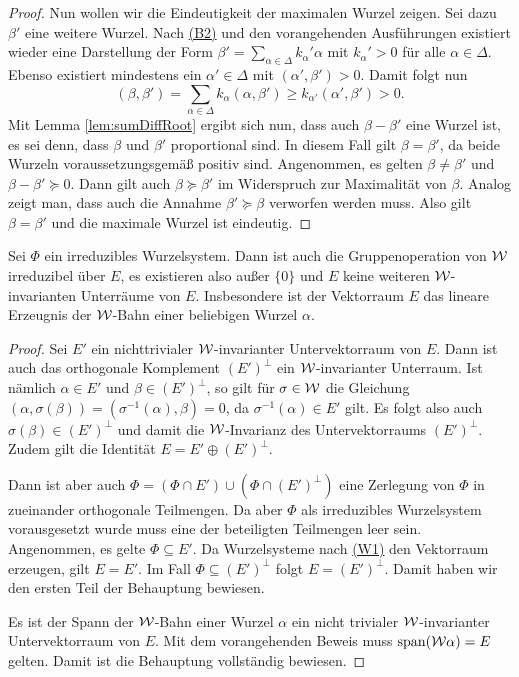 \begin{proof}
  Nun wollen wir die Eindeutigkeit der maximalen Wurzel zeigen.
  Sei dazu $\beta'$ eine weitere Wurzel.
  Nach \hyperref[it:B2]{(B2)} und den vorangehenden Ausführungen existiert wieder eine Darstellung der Form $\beta' = \sum_{\alpha \in \Delta} k_\alpha' \alpha$ mit $k_\alpha' > 0$ für alle $\alpha \in \Delta$.
  Ebenso existiert mindestens ein $\alpha' \in \Delta$ mit $(\alpha', \beta') > 0$.
  Damit folgt nun
  \begin{displaymath}
    (\beta, \beta') = \sum_{\alpha \in \Delta} k_\alpha (\alpha, \beta') \geq k_{\alpha'} (\alpha', \beta') > 0.
  \end{displaymath}
  Mit Lemma \ref{lem:sumDiffRoot} ergibt sich nun, dass auch $\beta - \beta'$ eine Wurzel ist, es sei denn, dass $\beta$ und $\beta'$ proportional sind. 
  In diesem Fall gilt $\beta = \beta'$, da beide Wurzeln voraussetzungsgemäß positiv sind.
  Angenommen, es gelten $\beta \neq \beta'$ und $\beta - \beta' \succeq 0$.
  Dann gilt auch $\beta \succeq \beta'$ im Widerspruch zur Maximalität von $\beta$.
  Analog zeigt man, dass auch die Annahme $\beta' \succeq \beta$ verworfen werden muss.
  Also gilt $\beta = \beta'$ und die maximale Wurzel ist eindeutig.
\end{proof}

\begin{lem}
  \label{lem:irreducibleGroupOp}
  Sei $\Phi$ ein irreduzibles Wurzelsystem.
  Dann ist auch die Gruppenoperation von $\mathcal{W}$ irreduzibel über $E$, es existieren also außer $\{0\}$ und $E$ keine weiteren $\mathcal{W}$\hyp{}invarianten Unterräume von $E$.
  Insbesondere ist der Vektorraum $E$ das lineare Erzeugnis der $\mathcal{W}$\hyp{}Bahn einer beliebigen Wurzel $\alpha$.
\end{lem}

\begin{proof}
  Sei $E'$ ein nichttrivialer $\mathcal{W}$\hyp{}invarianter Untervektorraum von $E$.
  Dann ist auch das orthogonale Komplement $(E')^\perp$ ein $\mathcal{W}$\hyp{}invarianter Unterraum.
  Ist nämlich $\alpha \in E'$ und $\beta \in (E')^\perp$, so gilt für $\sigma \in \mathcal{W}$ die Gleichung
  $( \alpha, \sigma(\beta) ) = ( \sigma^{-1}(\alpha), \beta ) = 0$, da $\sigma^{-1}(\alpha) \in E'$ gilt.
  Es folgt also auch $\sigma(\beta) \in (E')^\perp$ und damit die $\mathcal{W}$\hyp{}Invarianz des Untervektorraums $(E')^\perp$. 
  Zudem gilt die Identität $E = E' \oplus (E')^\perp$.

  Dann ist aber auch $\Phi = (\Phi \cap E') \cup (\Phi \cap (E')^\perp)$ eine Zerlegung von $\Phi$ in zueinander orthogonale Teilmengen.
  Da aber $\Phi$ als irreduzibles Wurzelsystem vorausgesetzt wurde muss eine der beteiligten Teilmengen leer sein.
  Angenommen, es gelte $\Phi \subseteq E'$. 
  Da Wurzelsysteme nach \hyperref[it:W1]{(W1)} den Vektorraum erzeugen, gilt $E = E'$. 
  Im Fall $\Phi \subseteq (E')^\perp$ folgt $E = (E')^\perp$.
  Damit haben wir den ersten Teil der Behauptung bewiesen.

  Es ist der Spann der $\mathcal{W}$\hyp{}Bahn einer Wurzel $\alpha$ ein nicht trivialer $\mathcal{W}$\hyp{}invarianter Untervektorraum von $E$.
  Mit dem vorangehenden Beweis muss $\operatorname{span}(\mathcal{W}\alpha) = E$ gelten.
  Damit ist die Behauptung vollständig bewiesen.
\end{proof}

